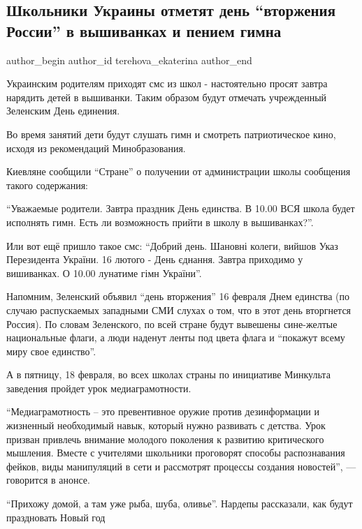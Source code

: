  
 
 
 
 
 
\subsection{Школьники Украины отметят день \enquote{вторжения России} в вышиванках и пением гимна}
\label{sec:15_02_2022.stz.news.ua.strana.5.shkolniki_den_vtorzhenia}
 
\ifcmt
 author_begin
   author_id terehova_ekaterina
 author_end
\fi

Украинским родителям приходят смс из школ - настоятельно просят завтра нарядить
детей в вышиванки. Таким образом будут отмечать учрежденный Зеленским День
единения.

Во время занятий дети будут слушать гимн и смотреть патриотическое кино, исходя
из рекомендаций Минобразования.


Киевляне сообщили \enquote{Стране} о получении от администрации школы сообщения такого
содержания:

\enquote{Уважаемые родители. Завтра праздник День единства. В 10.00 ВСЯ школа будет
исполнять гимн. Есть ли возможность прийти в школу в вышиванках?}.

Или вот ещё пришло такое смс: \enquote{Добрий день. Шановні колеги, вийшов Указ
Перезидента України. 16 лютого - День єднання. Завтра приходимо у вишиванках. О
10.00 лунатиме гімн України}.

Напомним, Зеленский объявил \enquote{день вторжения} 16 февраля Днем единства (по
случаю распускаемых западными СМИ слухах о том, что в этот день вторгнется
Россия). По словам Зеленского, по всей стране будут вывешены сине-желтые
национальные флаги, а люди наденут ленты под цвета флага и \enquote{покажут всему миру
свое единство}.

А в пятницу, 18 февраля, во всех школах страны по инициативе Минкульта
заведения пройдет урок медиаграмотности.

\enquote{Медиаграмотность – это превентивное оружие против дезинформации и жизненный
необходимый навык, который нужно развивать с детства. Урок призван привлечь
внимание молодого поколения к развитию критического мышления. Вместе с
учителями школьники проговорят способы распознавания фейков, виды манипуляций в
сети и рассмотрят процессы создания новостей}, — говорится в анонсе.

\enquote{Прихожу домой, а там уже рыба, шуба, оливье}. Нардепы рассказали, как будут
праздновать Новый год
